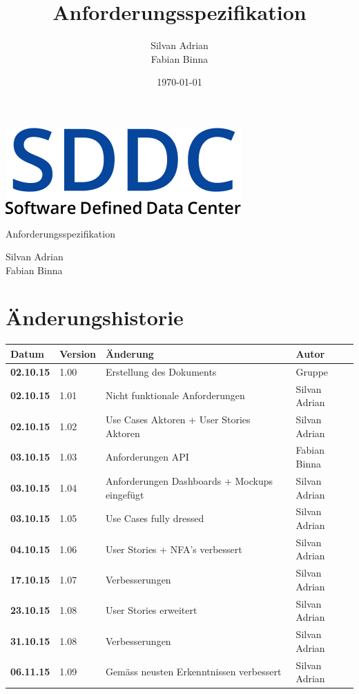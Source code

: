 \documentclass[11pt]{scrartcl}
\title{Anforderungsspezifikation}
\author{Silvan Adrian \\ Fabian Binna}
\date{\today{}}
\begin{document}
\def\arraystretch{1.5}
\begin{titlepage}
\begin{center}
\vspace{10em}
\includegraphics[scale=2]{SDDC}
\vspace{10em}
\end{center}
\begin{center}
\huge {Anforderungsspezifikation}
\end{center}
\begin{center}
\vspace{10em}
\LARGE {Silvan Adrian} \\
\LARGE {Fabian Binna}
\end{center}

\end{titlepage}

\newpage
\section{Änderungshistorie}
\begin{tabularx}{\linewidth}{l l X l}
\textbf{Datum} & \textbf{Version} & \textbf{Änderung}  & \textbf{Autor} \\
\hline
\textbf{02.10.15} & 1.00 & Erstellung des Dokuments & Gruppe \\
\textbf{02.10.15} & 1.01 & Nicht funktionale Anforderungen & Silvan Adrian\\
\textbf{02.10.15} & 1.02 & Use Cases Aktoren + User Stories Aktoren & Silvan 
Adrian\\
\textbf{03.10.15} & 1.03 & Anforderungen API & Fabian Binna\\
\textbf{03.10.15} & 1.04 & Anforderungen Dashboards + Mockups eingefügt & Silvan 
Adrian\\
\textbf{03.10.15} & 1.05 & Use Cases fully dressed & Silvan Adrian\\
\textbf{04.10.15} & 1.06 & User Stories + NFA's verbessert & Silvan Adrian\\
\textbf{17.10.15} & 1.07 & Verbesserungen & Silvan Adrian\\
\textbf{23.10.15} & 1.08 & User Stories erweitert & Silvan Adrian\\
\textbf{31.10.15} & 1.08 & Verbesserungen & Silvan Adrian\\
\textbf{06.11.15} & 1.09 & Gemäss neusten Erkenntnissen verbessert & Silvan Adrian\\
\end{tabularx}
\end{document}
